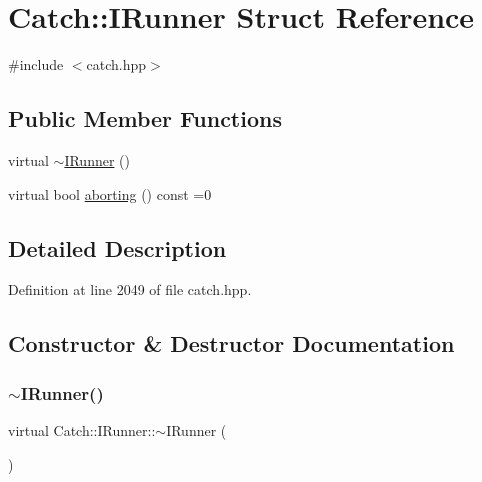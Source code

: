 \hypertarget{struct_catch_1_1_i_runner}{}\section{Catch\+:\+:I\+Runner Struct Reference}
\label{struct_catch_1_1_i_runner}


{\ttfamily \#include $<$catch.\+hpp$>$}

\subsection*{Public Member Functions}
\begin{DoxyCompactItemize}
\item 
virtual \hyperlink{struct_catch_1_1_i_runner_a5f539a88a7772d68de8a2e4028774209}{$\sim$\+I\+Runner} ()
\item 
virtual bool \hyperlink{struct_catch_1_1_i_runner_a03713202dd2e041e30b8030088ab0116}{aborting} () const =0
\end{DoxyCompactItemize}


\subsection{Detailed Description}


Definition at line 2049 of file catch.\+hpp.



\subsection{Constructor \& Destructor Documentation}
\hypertarget{struct_catch_1_1_i_runner_a5f539a88a7772d68de8a2e4028774209}{}\label{struct_catch_1_1_i_runner_a5f539a88a7772d68de8a2e4028774209} 
\subsubsection{\texorpdfstring{$\sim$\+I\+Runner()}{~IRunner()}}
{\footnotesize\ttfamily virtual Catch\+::\+I\+Runner\+::$\sim$\+I\+Runner (\begin{DoxyParamCaption}{ }\end{DoxyParamCaption})\hspace{0.3cm}{\ttfamily [virtual]}}




